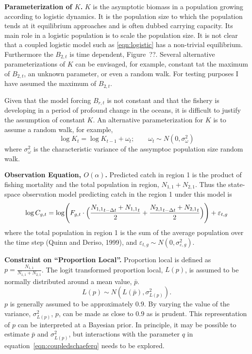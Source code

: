 \documentclass[12pt,letterpaper]{article}
\newcommand\None{{N_{1,1}}}
\newcommand\Ntwo{{N_{2,1}}}
\newcommand\Nsum{{N_{1,1}+N_{2,1}}}
\begin{document}
{\bf Parameterization of $K$.}
$K$ is the asymptotic biomass in a population growing according to
logistic dynamics. It is the population size to which the population
tends at it equilibrium approaches and is often dubbed carrying
capacity. Its main role in a logistic population is to scale the
population size. It is not clear that a coupled logistic model such as
\ref{eqn:logistic} has a non-trivial equilibrium. Furthermore the
$B_{2,t}$ is time dependent, Figure~??. Several alternative
parameterizations of $K$ can be envisaged, for example, constant tat
the maximum of $B_{2,t}$, an unknown parameter, or even a random walk.
For testing purposes I have assumed the maximum of $B_{2,t}$.

Given that the model forcing $B_{r,t}$ is not constant and that the
fishery is developing in a period of profound change in the oceans,
it is difficult to justify the assumption of constant $K$. An
alternative parameterization for $K$ is to assume a random walk, for
example,
\begin{equation}
\log K_t = \log K_{t-1} + \omega_t;\qquad \omega_t\sim
N(0,\sigma^2_\omega) \label{eqn:Kwalk}
\end{equation}
where  $\sigma^2_\omega$ is the characteristic variance of the
assymptoc population size random walk.

{\bf Observation Equation, $O(\alpha)$.}
Predicted catch in region 1 is the product of fishing mortality
and the total population in region, $\None+\Ntwo$.
Thus the state-space observation model predicting catch in the region 1
under this model is
\begin{equation}
\log C_{g,t} = \log \Biggl(F_{g,t}\cdot\Bigl(\frac{\None_{t-\Delta t}+\None_t}{2}
                           +\frac{\Ntwo_{t-\Delta
t}+\Ntwo_t}{2}\Bigr)\Biggr) + \varepsilon_{t,g}
\label{eqn:obs}
\end{equation}
where the total population in region 1 is the sum of the average
population over the time step (Quinn and Deriso, 1999), and
$\varepsilon_{t,g} \sim N(0,\sigma^2_{\varepsilon,g})$.

{\bf Constraint on ``Proportion Local''.}
Proportion local is defined as $p = \frac{\None}{\Nsum}$. The logit
transformed proportion local, $L(p)$, is assumed to be normally
distributed around a mean value, $\bar{p}$.
\begin{equation}
\label{eqn:LpropL}
L(p)\sim N(L(\bar{p}),\sigma^2_{L(p)}).
\end{equation} 
$p$ is generally assumed to be approximately $0.9$. By varying the
value of the variance, $\sigma^2_{L(p)}$, $p$, can be made as
close to $0.9$ as is prudent.
This representation of $p$ can be interpreted at a Bayesian prior.
In principle, it may be possible to
estimate $\bar{p}$ and $\sigma^2_{L(p)}$, but interactions with
the parameter $q$ in equation~\ref{eqn:coupledschaeferq} needs to be
explored.
\end{document}
